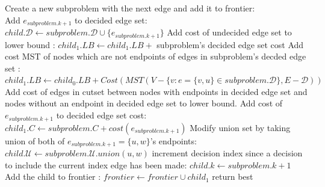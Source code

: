 \documentclass[format=sigconf]{acmart}
\begin{document}
\begin{algorithm}[htbp]
\begin{algorithmic}
						\ENDIF
					\ELSE
						\STATE Create a new subproblem with the next edge and add it to frontier:\\
						\vspace{4pt}
						\STATE Add $e_{subproblem.k+1}$ to decided edge set: $child.\mathcal{D} \leftarrow subproblem.\mathcal{D} \cup \{ e_{subproblem.k+1} \}$
						\STATE Add cost of undecided edge set to lower bound : $child_1.LB \leftarrow child_1.LB + $ subproblem's decided edge set cost
						\STATE Add cost MST of nodes which are not endpoints of edges in subproblem's decded edge set : \\
						$child_1.LB \leftarrow child_0.LB + Cost( MST( V - \{ v : e = \{ v,u \} \in subproblem.\mathcal{D} \}, E-\mathcal{D} ) )$ 
						\STATE Add cost of edges in cutset between nodes with endpoints in decided edge set and nodes without an endpoint in decided edge set to lower bound.
						\STATE Add cost of $e_{subproblem.k+1}$ to decided edge set cost: $child_1.C \leftarrow subproblem.C + cost(e_{subproblem.k+1})$ 
						\STATE Modify union set by taking union of both of $e_{subproblem.k+1}=\{u,w\}$'s endpoints: $child.\mathcal{U} \leftarrow subproblem.\mathcal{U}.union(u,w)$ 
						\STATE increment decision index since a decision to include the current index edge has been made: $child.k \leftarrow subproblem.k+1$
						\STATE Add the child to frontier : $frontier \leftarrow frontier \cup child_1$
					\ENDIF 
				\ENDIF
			\ENDIF
		\ENDWHILE
		\STATE return best
	\end{algorithmic}
\end{algorithm}
\end{document}
